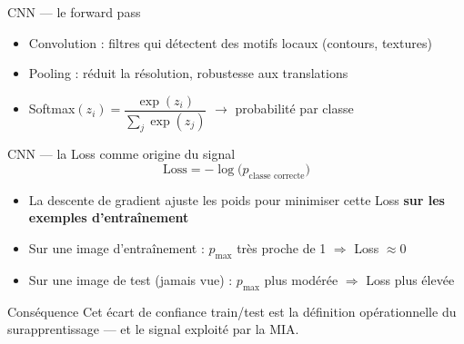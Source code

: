 \documentclass[11pt]{beamer}
\begin{document}
\begin{frame}{CNN --- le forward pass}
  \begin{center}
  \end{center}
  \vspace{4mm}
  \begin{itemize}
    \item Convolution : filtres qui détectent des motifs locaux (contours, textures)
    \item Pooling : réduit la résolution, robustesse aux translations
    \item Softmax$(z_i) = \dfrac{\exp(z_i)}{\sum_j \exp(z_j)}$ $\rightarrow$ probabilité par classe
  \end{itemize}
\end{frame}

\begin{frame}{CNN --- la Loss comme origine du signal}
  \[
    \text{Loss} = -\log\big(p_{\text{classe correcte}}\big)
  \]
  \begin{itemize}
    \item La descente de gradient ajuste les poids pour minimiser cette Loss
          \textbf{sur les exemples d'entraînement}
    \item Sur une image d'entraînement : $p_{\max}$ très proche de 1 $\Rightarrow$ Loss $\approx 0$
    \item Sur une image de test (jamais vue) : $p_{\max}$ plus modérée $\Rightarrow$ Loss plus élevée
  \end{itemize}
  \begin{alertblock}{Conséquence}
    Cet écart de confiance train/test est la définition opérationnelle
    du surapprentissage --- et le signal exploité par la MIA.
  \end{alertblock}
\end{frame}
\end{document}

